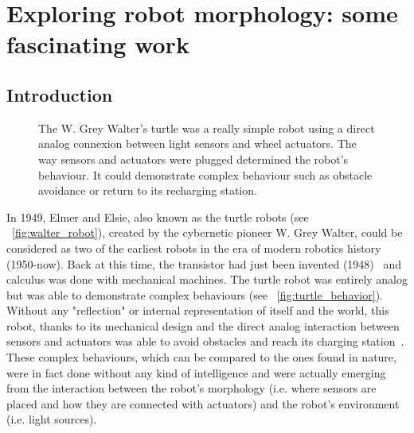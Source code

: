 
\cleartoleftpage


\chapter{Exploring robot morphology: some fascinating work} %
\label{cha:morphology-review}


\section{Introduction} %

\begin{figure}[!b]
\centering
    \hfil
    \caption{The W. Grey Walter's turtle was a really simple robot using a direct analog connexion between light sensors and wheel actuators. The way sensors and actuators were plugged determined the robot’s behaviour. It could demonstrate complex behaviour such as obstacle avoidance or return to its recharging station.}
    \label{fig:turtle_robot}
\end{figure}


In 1949, Elmer and Elsie, also known as the turtle robots (see \figurename~\ref{fig:walter_robot}), created by the cybernetic pioneer W. Grey Walter, could be considered as two of the earliest robots in the era of modern robotics history (1950-now). Back at this time, the transistor had just been invented (1948)~\parencite{brinkman1997history} and calculus was done with mechanical machines. The turtle robot was entirely analog but was able to demonstrate complex behaviours (see \figurename~\ref{fig:turtle_behavior}). Without any "reflection" or internal representation of itself and the world, this robot, thanks to its mechanical design and the direct analog interaction between sensors and actuators was able to avoid obstacles and reach its charging station~\parencite{walter1950imitation}.
These complex behaviours, which can be compared to the ones found in nature, were in fact done without any kind of intelligence and were actually emerging from the interaction between the robot’s morphology (i.e. where sensors are placed and how they are connected with actuators) and the robot’s environment (i.e. light sources).


